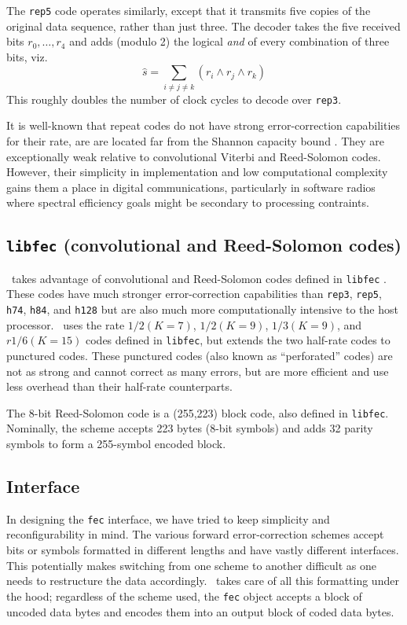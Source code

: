 The {\tt rep5} code operates similarly, except that it transmits five copies
of the original data sequence, rather than just three.
The decoder takes the five received bits $r_0,\ldots,r_4$ and adds (modulo
2) the logical {\it and} of every combination of three bits, viz.
\[
    \hat{s} = \sum_{i\ne j \ne k} {(r_i \land r_j \land r_k)}
\]
This roughly doubles the number of clock cycles to decode over {\tt rep3}.

It is well-known that repeat codes do not have strong error-correction
capabilities for their rate, are are located far from the Shannon capacity
bound \cite{Proakis:2001}.
They are exceptionally weak relative to convolutional Viterbi and Reed-Solomon
codes.
However, their simplicity in implementation and low computational complexity
gains them a place in digital communications, particularly in software radios
where spectral efficiency goals might be secondary to processing contraints.

\subsection{{\tt libfec} (convolutional and  Reed-Solomon codes)}
\label{module:fec:libfecv}
\liquid\ takes advantage of convolutional and Reed-Solomon codes defined in
{\tt libfec} \cite{fec:web}.
These codes have much stronger error-correction capabilities than {\tt rep3},
{\tt rep5}, {\tt h74}, {\tt h84}, and {\tt h128}
but are also much more computationally intensive to the host processor.
\liquid\ uses the rate $1/2 (K=7)$, $1/2 (K=9)$, $1/3 (K=9)$, and
$r1/6 (K=15)$ codes defined in {\tt libfec}, but extends the two half-rate
codes to punctured codes.
These punctured codes (also known as ``perforated'' codes) are not as strong
and cannot correct as many errors, but are more efficient and use less
overhead than their half-rate counterparts.

The 8-bit Reed-Solomon code is a (255,223) block code, also defined in
{\tt libfec}.
Nominally, the scheme accepts 223 bytes (8-bit symbols) and adds 32 parity
symbols to form a 255-symbol encoded block.

\subsection{Interface}
\label{module:fec:interface}
In designing the {\tt fec} interface, we have tried to keep simplicity and
reconfigurability in mind.
The various forward error-correction schemes accept bits or symbols
formatted in different lengths and have vastly different interfaces.
This potentially makes switching from one scheme to another difficult as one
needs to restructure the data accordingly.
\liquid\ takes care of all this formatting under the hood; regardless of the
scheme used, the {\tt fec} object accepts a block of uncoded data bytes and
encodes them into an output block of coded data bytes.


